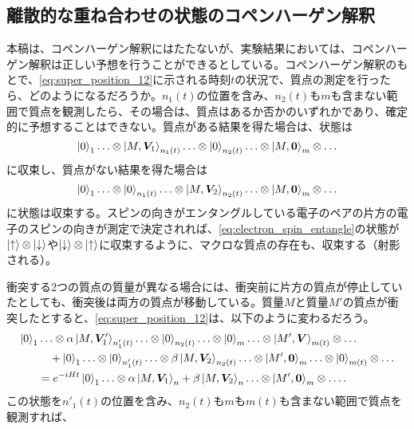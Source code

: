 \subsection{離散的な重ね合わせの状態のコペンハーゲン解釈}
本稿は、コペンハーゲン解釈にはたたないが、実験結果においては、コペンハーゲン解釈は正しい予想を行うことができるとしている。コペンハーゲン解釈のもとで、\eqref{eq:super_position_12}に示される時刻$t$の状況で、質点の測定を行ったら、どのようになるだろうか。$n_1(t)$の位置を含み、$n_2(t)$も$m$も含まない範囲で質点を観測したら、その場合は、質点はあるか否かのいずれかであり、確定的に予想することはできない。質点がある結果を得た場合は、状態は
\begin{equation}
    \ket{0}_1 \ldots \otimes \ket{M,\bm{V}_1}_{n_1(t)} \ldots \otimes \ket{0}_{n_2(t)}  \ldots \otimes \ket{M,\bm{0}}_m \otimes\ldots 
\end{equation}
に収束し、質点がない結果を得た場合は
\begin{equation}
    \ket{0}_1 \ldots \otimes \ket{0}_{n_1(t)} \ldots \otimes \ket{M,\bm{V}_2}_{n_2(t)}  \ldots \otimes \ket{M,\bm{0}}_m \otimes \ldots \nonumber
\end{equation}
に状態は収束する。スピンの向きがエンタングルしている電子のペアの片方の電子のスピンの向きが測定で決定されれば、\eqref{eq:electron_spin_entangle}の状態が$\ket{\uparrow} \otimes \ket{\downarrow}$や$\ket{\downarrow} \otimes \ket{\uparrow}$に収束するように、マクロな質点の存在も、収束する（射影される）。\par
衝突する2つの質点の質量が異なる場合には、衝突前に片方の質点が停止していたとしても、衝突後は両方の質点が移動している。質量$M$と質量$M'$の質点が衝突したとすると、\eqref{eq:super_position_12}は、以下のように変わるだろう。
\begin{align}
    \label{eq:super_position_12_diffrent_mass}
    \ket{0}_1 & \ldots \otimes \alpha \ket{M,\bm{V}_1'}_{n'_1(t)} \ldots \otimes \ket{0}_{n_2(t)}  \ldots \otimes \ket{0}_m \ldots \otimes \ket{M',\bm{V}}_{m(t)} \otimes\ldots \\
    & \quad + \ket{0}_1 \ldots \otimes \ket{0}_{n'_1(t)} \ldots \otimes \beta \ket{M,\bm{V}_2}_{n_2(t)}  \ldots \otimes \ket{M',\bm{0}}_m \ldots \otimes \ket{0}_{m(t)} \otimes \ldots \nonumber \\
    &=e^{-iHt}\ket{0}_1 \ldots \otimes \alpha \ket{M,\bm{V}_1}_n + \beta \ket{M,\bm{V}_2}_n \ldots \otimes \ket{M',\bm{0}}_m \otimes \ldots .\nonumber
\end{align}
この状態を$n'_1(t)$の位置を含み、$n_2(t)$も$m$も$m(t)$も含まない範囲で質点を観測すれば、
